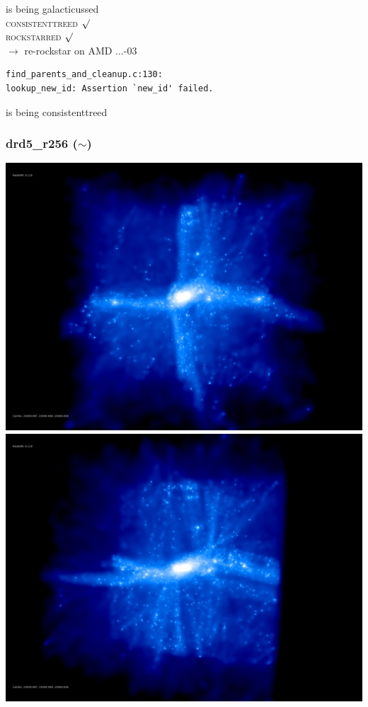 is being galacticussed \\
\textsc{consistenttreed} $\surd$ \\
\textsc{rockstarred} $\surd$ \\
$\rightarrow$  re-rockstar on AMD ...-03 \\
\begin{verbatim}
find_parents_and_cleanup.c:130: 
lookup_new_id: Assertion `new_id' failed.
\end{verbatim}
is being consistenttreed \\ 

% 
%
%
%
%
%
%
%

\newpage

\subsubsection{drd5\_r256 ($\sim$)} 

\includegraphics[scale=0.12]{r256/h100/drd5_r256/rotate_1.png} 
\includegraphics[scale=0.12]{r256/h100/drd5_r256/rotate_2.png} \\

